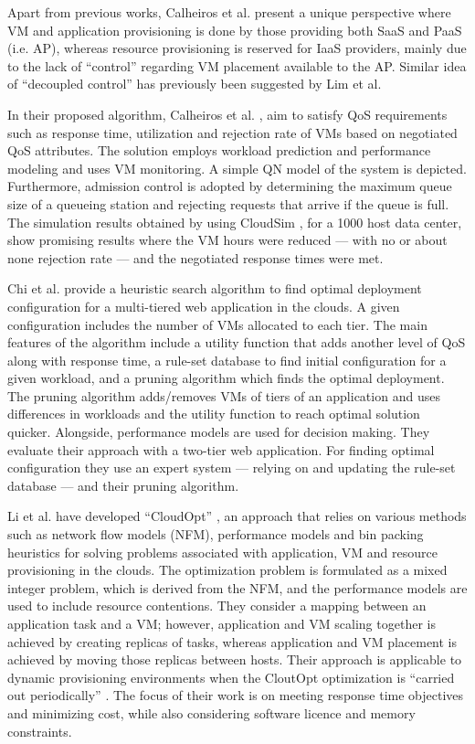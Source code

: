 \documentclass[10pt,journal,cspaper,compsoc]{IEEEtran}
\begin{document}
Apart from previous works, Calheiros et al. \cite{calheirosvirtual3} present a unique perspective where VM and application provisioning is done by those providing both SaaS and PaaS (i.e. AP), whereas resource provisioning is reserved for IaaS providers, mainly due to the lack of ``control'' \cite{calheirosvirtual3} regarding VM placement available to the AP. Similar idea of ``decoupled control'' \cite{2009_AutomatedControlCloudChallenges} has previously been suggested by Lim et al. 

In their proposed algorithm, Calheiros et al. \cite{calheirosvirtual3}, aim to satisfy QoS requirements such as response time, utilization and rejection rate of VMs based on negotiated QoS attributes. The solution employs workload prediction and performance modeling and uses VM monitoring. A simple QN model of the system is depicted. Furthermore, admission control is adopted by determining the maximum queue size of a queueing station and rejecting requests that arrive if the queue is full. The simulation results obtained by using CloudSim \cite{2011_CloudSimAToolkit}, for a 1000 host data center, show promising results where the VM hours were reduced --- with no or about none rejection rate --- and the negotiated response times were met.

Chi et al. \cite{chiheuristic28} provide a heuristic search algorithm to find optimal deployment configuration for a multi-tiered web application in the clouds. A given configuration includes the number of VMs allocated to each tier. The main features of the algorithm include a utility function that adds another level of QoS along with response time, a rule-set database to find initial configuration for a given workload, and  a pruning algorithm which finds the optimal deployment. The pruning algorithm adds/removes VMs of tiers of an application and uses differences in workloads and the utility function to reach optimal solution quicker. Alongside, performance models are used for decision making. They evaluate their approach with a two-tier web application. For finding optimal configuration they use an expert system --- relying on and updating the rule-set database --- and their pruning algorithm.


Li et al. \cite{2011_JimLiCloudOpt} have developed ``CloudOpt'' \cite{2011_JimLiCloudOpt}, an approach that relies on various methods such as network flow models (NFM),  performance models and  bin packing heuristics for solving problems associated with application, VM and resource provisioning in the clouds. The optimization problem is formulated as a mixed integer problem, which is derived from the NFM, and the performance models are used to include resource contentions. They consider a mapping between an application task and a VM; however, application and VM scaling together is achieved by creating replicas of tasks, whereas application and VM placement is achieved by moving those replicas between hosts. Their approach is applicable to dynamic provisioning environments when the CloutOpt optimization is ``carried out periodically'' \cite{2011_JimLiCloudOpt}. The focus of their work is on meeting response time objectives and minimizing cost, while also considering software licence and memory constraints.
\end{document}
